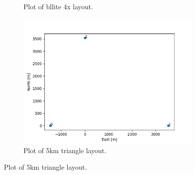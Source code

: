 \documentclass{article}
\begin{document}
\begin{figure}[t!]
\begin{subfigure}{0.30\textwidth}
\caption{Plot of bllite 4x layout.}
\label{fig:bllite4x}
\end{subfigure}
\begin{subfigure}{0.30\textwidth}
\includegraphics[width=\linewidth]{documentation_figures/5km_triangle_layout.png}
\caption{Plot of 5km triangle layout.}
\label{fig:5kt}
\end{subfigure}


\end{figure}
\end{document}
